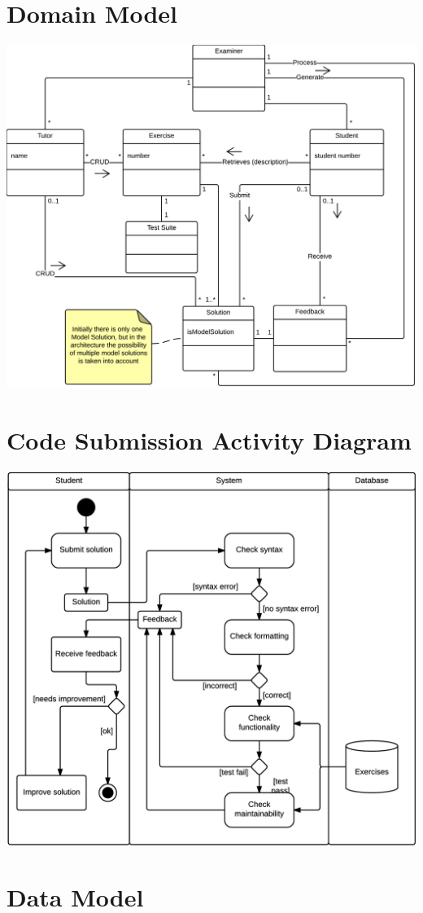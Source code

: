 \chapter{Domain Model} \label{app:domain-model}
\includegraphics[scale=0.75]{appendices/diagrams-images/domain-model}

\chapter{Code Submission Activity Diagram} \label{app:activity-diagram}
\includegraphics[scale=0.75]{appendices/diagrams-images/code-submission-activity-diagram}

\chapter{Data Model} \label{app:data-model}
